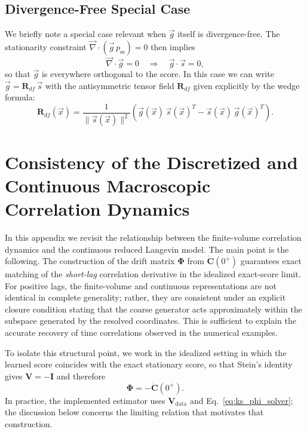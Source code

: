 \documentclass[%
  prl,
  reprint,
  amsmath,
  amssymb,
  aps
]{revtex4-2}
\newcommand{\vvec}[1]{\vec{#1}}
\begin{document}
\subsection{Divergence-Free Special Case}
\label{appendix:divergence_free}

We briefly note a special case relevant when $\vvec{g}$ itself is divergence-free. The stationarity constraint $\vvec{\nabla}\cdot(\vvec{g}\,p_{\mathrm{ss}})=0$ then implies
\begin{equation}
\vvec{\nabla}\cdot\vvec{g}=0
\quad\Longrightarrow\quad
\vvec{g}\cdot \vvec{s} = 0,
\end{equation}
so that $\vvec{g}$ is everywhere orthogonal to the score. In this case we can write $\vvec{g} = \bm{R}_{df}\,\vvec{s}$ with the antisymmetric tensor field $\bm{R}_{df}$ given explicitly by the wedge formula:
\begin{equation}
\label{eq:wedge_formula}
\bm{R}_{df}(\vvec{x})
=
\frac{1}{\|\vvec{s}(\vvec{x})\|^2}
\left(
\vvec{g}(\vvec{x})\,\vvec{s}(\vvec{x})^{T}
-
\vvec{s}(\vvec{x})\,\vvec{g}(\vvec{x})^{T}
\right).
\end{equation}

\section{Consistency of the Discretized and Continuous Macroscopic Correlation Dynamics}
\label{appendix:correlation_equivalence}

In this appendix we revisit the relationship between the finite-volume correlation dynamics and the continuous reduced Langevin model. The main point is the following. The construction of the drift matrix $\bm{\Phi}$ from $\dot{\bm{C}}(0^+)$ guarantees exact matching of the \emph{short-lag} correlation derivative in the idealized exact-score limit. For positive lags, the finite-volume and continuous representations are not identical in complete generality; rather, they are consistent under an explicit closure condition stating that the coarse generator acts approximately within the subspace generated by the resolved coordinates. This is sufficient to explain the accurate recovery of time correlations observed in the numerical examples.

To isolate this structural point, we work in the idealized setting in which the learned score coincides with the exact stationary score, so that Stein's identity gives $\bm{V}=-\bm{I}$ and therefore
\begin{equation}
\bm{\Phi}=-\dot{\bm{C}}(0^+).
\label{eq:appendix_exact_phi}
\end{equation}
In practice, the implemented estimator uses $\bm{V}_{\mathrm{data}}$ and Eq.~\eqref{eq:ks_phi_solver}; the discussion below concerns the limiting relation that motivates that construction.
\end{document}
